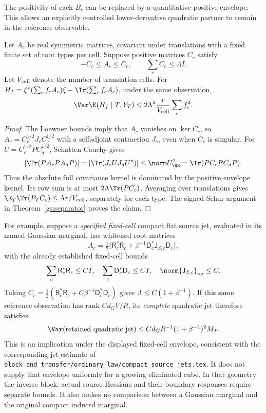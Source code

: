 The positivity of each \(B_c\) can be replaced by a quantitative positive
envelope. This allows an explicitly controlled lower-derivative quadratic
partner to remain in the reference observable.

\begin{proposition}
\label{gs:envelope}
Let \(A_c\) be real symmetric matrices, covariant under translations with a
fixed finite set of root types per cell. Suppose positive matrices \(C_c\)
satisfy
\[
 -C_c\le A_c\le C_c,\qquad \sum_cC_c\le\Lambda I.
\]
Let \(V_{\rm cell}\) denote the number of translation cells. For
\(H_f=\xi^*(\sum_cf_cA_c)\xi-\Tr(\sum_cf_cA_c)\), under the same observation,
\begin{equation}
 \Var\E(H_f\mid T,Y_T)
 \le2\Lambda^2\frac r{V_{\rm cell}}\sum_cf_c^2.
 \label{gs:envelopebound}
\end{equation}
\end{proposition}
\begin{proof}
The Loewner bounds imply that \(A_c\) vanishes on \(\ker C_c\), so
\(A_c=C_c^{1/2}J_cC_c^{1/2}\) with a selfadjoint contraction \(J_c\), even
when \(C_c\) is singular. For \(U=C_c^{1/2}PC_d^{1/2}\), Schatten Cauchy gives
\[
 |\Tr(PA_cPA_dP)|=|\Tr(J_cUJ_dU^*)|
 \le\norm U_{\HS}^2=\Tr(PC_cPC_dP).
\]
Thus the absolute full covariance kernel is dominated by the positive envelope
kernel. Its row sum is at most \(2\Lambda\Tr(PC_c)\). Averaging over translations
gives \(\E_T\Tr(P_TC_c)\le\Lambda r/V_{\rm cell}\), separately for each type.
The signed Schur argument in Theorem~\ref{gs:separator} proves the claim.
\end{proof}

For example, suppose a \emph{specified fixed-cell} compact flat source jet,
evaluated in its named Gaussian marginal, has whitened root matrices
\[
 A_c=\tfrac12\bigl(\mathsf R_c^*\mathsf R_c
        +\beta^{-1}\mathsf D_c^*\mathsf J_{\beta,c}\mathsf D_c\bigr),
\]
with the already established fixed-cell bounds
\[
 \sum_c\mathsf R_c^*\mathsf R_c\le CI,\quad
 \sum_c\mathsf D_c^*\mathsf D_c\le CI,\quad
 \norm{\mathsf J_{\beta,c}}_{\rm op}\le C.
\]
Taking
\(C_c=\tfrac12(\mathsf R_c^*\mathsf R_c+
C\beta^{-1}\mathsf D_c^*\mathsf D_c)\) gives
\(\Lambda\le C(1+\beta^{-1})\). If this same reference observation has rank
\(Cd_GV/R\), its \emph{complete} quadratic jet therefore satisfies
\[
 \Var(\hbox{retained quadratic jet})
 \le Cd_GR^{-1}(1+\beta^{-1})^2M_f.
\]
This is an implication under the displayed fixed-cell envelope, consistent with
the corresponding jet estimate of \texttt{block\_and\_transfer/ordinary\_law/compact\_source\_jets.tex}. It does not supply that
envelope uniformly for a growing eliminated cube. In that geometry the inverse
block, actual source Hessians and their boundary responses require separate
bounds. It also makes no comparison between a Gaussian marginal and the
original compact induced marginal.

